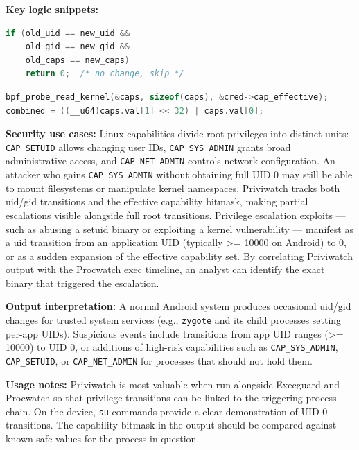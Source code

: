 \documentclass{mnitjaipur}
\begin{document}
\textbf{Key logic snippets:}
\begin{lstlisting}[language=C,caption={Priviwatch change detection filter}]
if (old_uid == new_uid &&
    old_gid == new_gid &&
    old_caps == new_caps)
    return 0;  /* no change, skip */
\end{lstlisting}

\begin{lstlisting}[language=C,caption={Priviwatch safe capability read (avoiding CO-RE relocation)}]
bpf_probe_read_kernel(&caps, sizeof(caps), &cred->cap_effective);
combined = ((__u64)caps.val[1] << 32) | caps.val[0];
\end{lstlisting}

\textbf{Security use cases:} Linux capabilities divide root privileges into distinct units: \texttt{CAP\_SETUID} allows changing user IDs, \texttt{CAP\_SYS\_ADMIN} grants broad administrative access, and \texttt{CAP\_NET\_ADMIN} controls network configuration. An attacker who gains \texttt{CAP\_SYS\_ADMIN} without obtaining full UID 0 may still be able to mount filesystems or manipulate kernel namespaces. Priviwatch tracks both uid/gid transitions and the effective capability bitmask, making partial escalations visible alongside full root transitions. Privilege escalation exploits — such as abusing a setuid binary or exploiting a kernel vulnerability — manifest as a uid transition from an application UID (typically \textgreater{}= 10000 on Android) to 0, or as a sudden expansion of the effective capability set. By correlating Priviwatch output with the Procwatch exec timeline, an analyst can identify the exact binary that triggered the escalation.

\textbf{Output interpretation:} A normal Android system produces occasional uid/gid changes for trusted system services (e.g., \texttt{zygote} and its child processes setting per-app UIDs). Suspicious events include transitions from app UID ranges (\textgreater{}= 10000) to UID 0, or additions of high-risk capabilities such as \texttt{CAP\_SYS\_ADMIN}, \texttt{CAP\_SETUID}, or \texttt{CAP\_NET\_ADMIN} for processes that should not hold them.

\textbf{Usage notes:} Priviwatch is most valuable when run alongside Execguard and Procwatch so that privilege transitions can be linked to the triggering process chain. On the device, \texttt{su} commands provide a clear demonstration of UID 0 transitions. The capability bitmask in the output should be compared against known-safe values for the process in question.
\end{document}
